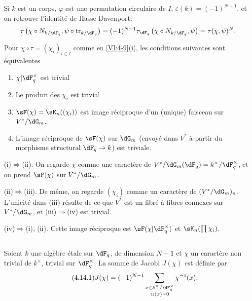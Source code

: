 Si $k$ est un corps, $\varphi$ est une permutation circulaire de $I$, 
$\varepsilon(k) = (-1)^{N+1}$, et on retrouve l'identit\'e de Hasse-Davenport: 
\[
  \tau\left(\chi\circ N_{k/\dF_q},\psi\circ \tr_{k/\dF_q}\right) = (-1)^{N+1} \tau_{\dF_q}\left(\chi\circ N_{k/\dF_q},\psi\right) = \tau(\chi,\psi)^N \text{.} 
\]





\begin{lemma_}\label{VI:4-13}
Pour $\chi\circ \tau=(\chi_i)_{i\in I}$ comme en \ref{VI:4-9}(i), les
conditions suivantes sont \'equivalentes 
\begin{enumerate}[\indent (i)]
  \item $\chi| \dF_q^\times$ est trivial 
  \item Le produit des $\chi_i$ est trivial 
  \item $\sF(\chi) = \sK_n((\chi_i))$ est image r\'eciproque d'un (unique) 
    faisceau sur $V^\ast/\dG_m$. 
  \item L'image r\'eciproque de $\sF(\chi)$ sur $\dG_m$ (envoy\'e dans 
    $V^\ast$ \`a partir du morphisme structural $\dF_q \to k$) est triviale. 
\end{enumerate}
\end{lemma_}

(i)$\Rightarrow$(ii). On regarde $\chi$ comme une caract\`ere de 
$V^\ast/\dG_m(\dF_q)=k^\times/\dF_q^\times$, et on prend $\sF(\chi)$ sur 
$V^\ast/\dG_m$. 

(ii)$\Rightarrow$(iii). De m\^eme, on regarde $(\chi_i)$ comme un caract\`ere 
de $(V^\ast/\dG_m)_n$. L'unicit\'e dans (iii) r\'esulte de ce que $V^\ast$ est 
un fibr\'e \`a fibres connexes sur $V^\ast/\dG_m$, et (iii)$\Rightarrow$(iv)  
est trivial. 

(iv)$\Rightarrow$(i), (ii). Cette image r\'eciproque est 
$\sF(\chi|\dF_q^\times)$ et $\sK_n(\prod \chi_i)$. 





\subsection{}\label{VI:4-14}

Soient $k$ une alg\`ebre \'etale sur $\dF_q$, de 
dimension $N+1$ et $\chi$ un caract\`ere non trivial de $k^\times$, trivial sur 
$\dF_q^\times$. La somme de Jacobi $J(\chi)$ est d\'efinie par 
\begin{equation*}\tag{4.14.1}\label{VI:eq:4-14-1}
  J(\chi) = (-1)^{N-1} \sum_{\substack{x\in k^\times/\dF_q^\times \\ \tr(x)=0}} \chi^{-1}(x) \text{.} 
\end{equation*}

